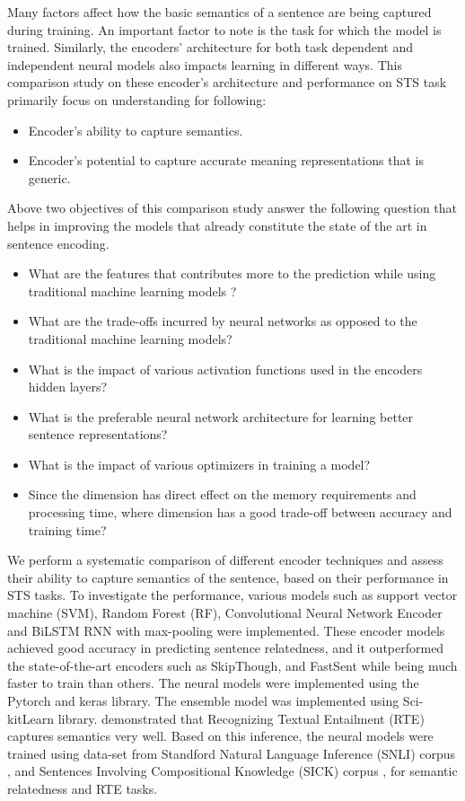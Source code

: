 \documentclass[12pt]{report} %
\begin{document}
Many factors affect how the basic semantics of a sentence are being captured during training. An important factor to note is the task for which the model is trained. Similarly, the encoders' architecture for both task dependent and independent neural models also impacts learning in different ways. This comparison study on these encoder's architecture and performance on STS task primarily focus on understanding for following:

\begin{itemize}
	\item Encoder's ability to capture semantics.
	\item Encoder's potential to capture accurate meaning representations that is generic.
\end{itemize}	

Above two objectives of this comparison study answer the following question that helps in improving the models that already constitute the state of the art in sentence encoding.

\begin{itemize}
	\item What are the features that contributes more to the prediction while using traditional machine learning models ?
	\item What are the trade-offs incurred by neural networks as opposed to the traditional machine learning models?
	\item What is the impact of various activation functions used in the encoders hidden layers?
	\item What is the preferable neural network architecture for learning better sentence representations? 
	\item What is the impact of various optimizers in training a model?
	\item Since the dimension has direct effect on the memory requirements and processing time, where dimension has a good trade-off between accuracy and training time? 
\end{itemize}

We perform a systematic comparison of different encoder techniques and assess their ability to capture semantics of the sentence, based on their performance in STS tasks. To investigate the performance, various models such as support vector machine (SVM), Random Forest (RF), Convolutional Neural Network Encoder \citep{shao2017hcti} and BiLSTM RNN with max-pooling \citep{conneau2017supervised} were implemented. These encoder models achieved good accuracy in predicting sentence relatedness, and it outperformed the state-of-the-art encoders such as SkipThough, and FastSent while being much faster to train than others. The neural models were implemented using the Pytorch and keras library. The ensemble model was implemented using Sci-kitLearn library. \cite{conneau2017supervised} demonstrated that Recognizing Textual Entailment (RTE) captures semantics very well. Based on this inference, the neural models were trained using data-set from Standford Natural Language Inference (SNLI) corpus  \citep{bowman2015large}, and Sentences Involving Compositional
Knowledge (SICK) corpus \citep{marelli2014semeval}, for semantic relatedness and RTE tasks.
 
\end{document}
